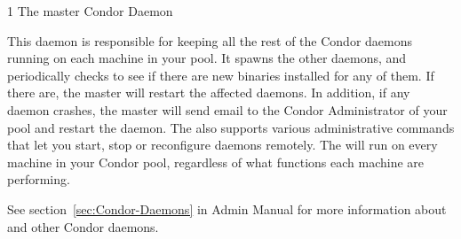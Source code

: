 \begin{ManPage}{\label{man-condor-master}}{1}
{The master Condor Daemon}
\Synopsis {}

\Description 

This daemon is responsible for keeping all the
rest of the Condor daemons running on each machine in your pool.  It  
spawns the other daemons, and periodically checks to see if there are
new binaries installed for any of them.  If there are, the master will
restart the affected daemons.  In addition, if any daemon crashes, the
master will send email to the Condor Administrator of your pool and 
restart the daemon.  The  also supports various
administrative commands that let you start, stop or reconfigure
daemons remotely.  The  will run on every machine in 
your Condor pool, regardless of what functions each machine are
performing.

See section~\ref{sec:Condor-Daemons} in Admin Manual for more information
about  and other Condor daemons.

\end{ManPage}
